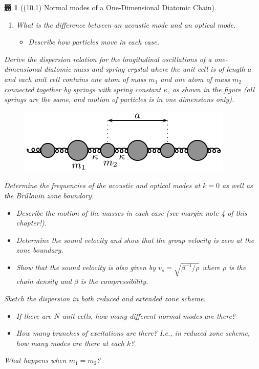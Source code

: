 \documentclass[UTF8,10pt,a4paper]{article}
\theoremstyle{Problem}
\newtheorem{prob}{题}
\theoremstyle{Solution}
\begin{document}
\thispagestyle{FirstPageStyle}
\begin{prob}[(10.1) Normal modes of a One-Dimensional Diatomic Chain]
    \begin{enumerate}
        \item[(a)] What is the difference between an acoustic mode and an optical mode.
        \begin{itemize}
            \item[$\triangleright$] Describe how particles move in each case.
        \end{itemize}
    \end{enumerate}
    \item[(b)] Derive the dispersion relation for the longitudinal oscillations of a one-dimensional diatomic mass-and-spring crystal where the unit cell is of length $a$ and each unit cell contains one atom of mass $m_1$ and one atom of mass $m_2$ connected together by springs with spring constant $\kappa$, as shown in the figure (all springs are the same, and motion of particles is in one dimensions only).
    \begin{figure}[h]
        \centering
        \includegraphics[width=.4\textwidth]{1.png}
    \end{figure}
    \item[(c)] Determine the frequencies of the acoustic and optical modes at $k=0$ as well as the Brillouin zone boundary.
    \begin{itemize}
        \item[$\triangleright$] Describe the motion of the masses in each case (see margin note 4 of this chapter!).
        \item[$\triangleright$] Determine the sound velocity and show that the group velocity is zero at the zone boundary.
        \item[$\triangleright$] Show that the sound velocity is also given by $v_s=\sqrt{\beta^{-1}/\rho}$ where $\rho$ is the chain density and $\beta$ is the compressibility.
    \end{itemize}
    \item[(d)] Sketch the dispersion in both reduced and extended zone scheme.
    \begin{itemize}
        \item[$\triangleright$] If there are $N$ unit cells, how many different normal modes are there?
        \item[$\triangleright$] How many \textit{branches} of excitations are there? I.e., in reduced zone scheme, how many modes are there at each $k$?
    \end{itemize}
    \item[(e)] What happens when $m_1=m_2$?
\end{prob}
\end{document}
